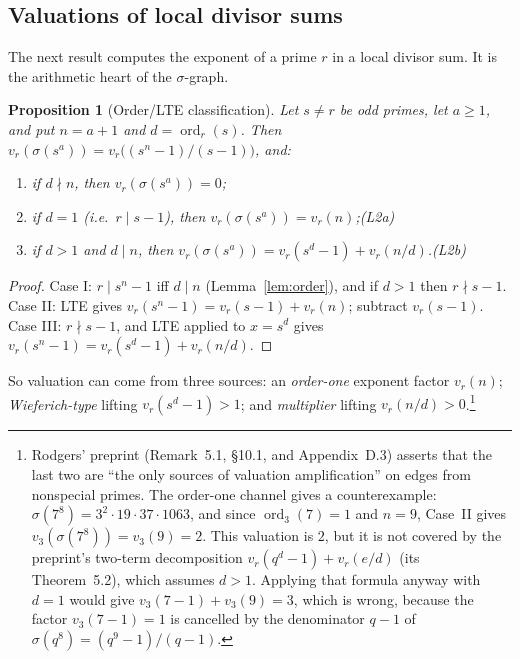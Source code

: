\documentclass[11pt]{article}
\newtheorem{proposition}[theorem]{Proposition}
\theoremstyle{definition}
\theoremstyle{remark}
\DeclareMathOperator{\ord}{ord}
\begin{document}
\subsection{Valuations of local divisor sums}\label{sec:edgeweights}

The next result computes the exponent of a prime $r$ in a local divisor sum.
It is the arithmetic heart of the $\sigma$-graph.

\begin{proposition}[Order/LTE classification]\label{prop:edgeweights}
Let $s\ne r$ be odd primes, let $a\ge1$, and put $n=a+1$ and
$d=\ord_r(s)$.  Then $v_r(\sigma(s^a))=v_r\bigl((s^n-1)/(s-1)\bigr)$, and:
\begin{enumerate}[label=\Roman*.]
\item if $d\nmid n$, then $v_r(\sigma(s^a))=0$;
\item if $d=1$ (i.e.\ $r\mid s-1$), then $v_r(\sigma(s^a))=v_r(n)$;\hfill(L2a)
\item if $d>1$ and $d\mid n$, then
  $v_r(\sigma(s^a))=v_r(s^d-1)+v_r(n/d)$.\hfill(L2b)
\end{enumerate}
\end{proposition}

\begin{proof}
Case I: $r\mid s^n-1$ iff $d\mid n$ (Lemma~\ref{lem:order}), and if $d>1$ then
$r\nmid s-1$.  Case II: LTE gives $v_r(s^n-1)=v_r(s-1)+v_r(n)$; subtract
$v_r(s-1)$.  Case III: $r\nmid s-1$, and LTE applied to $x=s^d$ gives
$v_r(s^n-1)=v_r(s^d-1)+v_r(n/d)$.
\end{proof}

So valuation can come from three sources: an \emph{order-one} exponent
factor $v_r(n)$; \emph{Wieferich-type} lifting $v_r(s^d-1)>1$; and
\emph{multiplier} lifting $v_r(n/d)>0$.\footnote{Rodgers' preprint
(Remark~5.1, \S10.1, and Appendix~D.3) asserts that the last two are ``the
only sources of valuation amplification'' on edges from nonspecial primes.
The order-one channel gives a counterexample:
$\sigma(7^8)=3^2\cdot19\cdot37\cdot1063$, and since $\ord_3(7)=1$ and
$n=9$, Case~II gives $v_3(\sigma(7^8))=v_3(9)=2$.  This valuation is $2$, but
it is not covered by the preprint's two-term decomposition
$v_r(q^d-1)+v_r(e/d)$ (its Theorem~5.2), which assumes $d>1$.  Applying that
formula anyway with $d=1$ would give $v_3(7-1)+v_3(9)=3$, which is wrong,
because the factor $v_3(7-1)=1$ is cancelled by the denominator $q-1$ of
$\sigma(q^8)=(q^9-1)/(q-1)$.}
\end{document}
